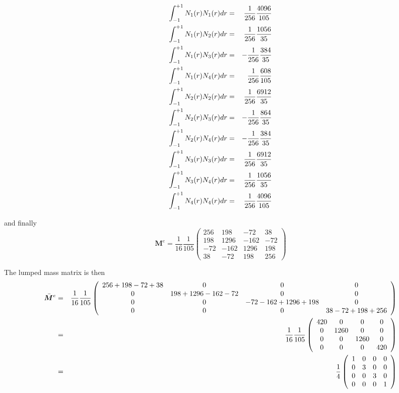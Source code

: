 \begin{eqnarray}
\int_{-1}^{+1} N_1(r) N_1(r) dr &=&  \frac{1}{256}\frac{4096}{105} \nonumber\\ 
\int_{-1}^{+1} N_1(r) N_2(r) dr &=&  \frac{1}{256}\frac{1056}{35} \nonumber\\
\int_{-1}^{+1} N_1(r) N_3(r) dr &=& -\frac{1}{256}\frac{384}{35} \nonumber\\
\int_{-1}^{+1} N_1(r) N_4(r) dr &=&  \frac{1}{256}\frac{608}{105} \nonumber\\
\int_{-1}^{+1} N_2(r) N_2(r) dr &=&  \frac{1}{256}\frac{6912}{35} \nonumber\\
\int_{-1}^{+1} N_2(r) N_3(r) dr &=& -\frac{1}{256}\frac{864}{35} \nonumber\\
\int_{-1}^{+1} N_2(r) N_4(r) dr &=& -\frac{1}{256}\frac{384}{35} \nonumber\\
\int_{-1}^{+1} N_3(r) N_3(r) dr &=&  \frac{1}{256}\frac{6912}{35}\nonumber\\
\int_{-1}^{+1} N_3(r) N_4(r) dr &=&  \frac{1}{256}\frac{1056}{35}\nonumber\\
\int_{-1}^{+1} N_4(r) N_4(r) dr &=&  \frac{1}{256}\frac{4096}{105}\nonumber
\end{eqnarray}

and finally 
\begin{equation}
{\bm M}^e 
=
\frac{1}{16}\frac{1}{105}
\left(
\begin{array}{cccc}
256 & 198 & -72  & 38  \\
198 & 1296 & -162 & -72 \\
-72 & -162 & 1296 & 198 \\
38 & -72 & 198 & 256
\end{array}
\right)
\end{equation}

The lumped mass matrix is then
\begin{eqnarray}
\bar{\bm M}^e 
&=&
\frac{1}{16}\frac{1}{105}
\left(
\begin{array}{cccc}
256 + 198 -72  +38 & 0 & 0 & 0  \\
0 & 198 + 1296  -162 -72 & 0 & 0\\
0 & 0 & -72 -162 + 1296 + 198 & 0\\
0 & 0 & 0 & 38 -72 + 198 + 256
\end{array}
\right) \nonumber\\
&=&
\frac{1}{16}\frac{1}{105}
\left(
\begin{array}{cccc}
420 & 0 & 0 & 0  \\
0 & 1260 & 0 & 0\\
0 & 0 & 1260 & 0\\
0 & 0 & 0 & 420
\end{array}
\right) \nonumber\\
&=&
\frac{1}{4}
\left(
\begin{array}{cccc}
1 & 0 & 0 & 0  \\
0 & 3 & 0 & 0\\
0 & 0 & 3 & 0\\
0 & 0 & 0 & 1
\end{array}
\right) \nonumber
\end{eqnarray}


